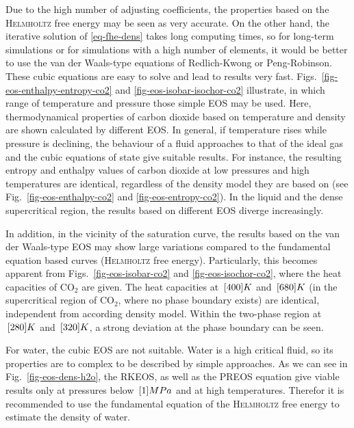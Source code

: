 Due to the high number of adjusting coefficients, the properties based on the \textsc{Helmholtz} free energy may be seen as very 
accurate. On the other hand, the iterative solution of \eqref{eq-fhe-dens} takes long computing times, so for long-term simulations or for simulations with a high number of elements, it would be better to use the {van der Waals}-type equations of {Redlich-Kwong} or {Peng-Robinson}. These cubic equations are easy to solve and lead to results very fast. Figs.~\ref{fig-eos-enthalpy-entropy-co2} and \ref{fig-eos-isobar-isochor-co2} illustrate, in which range of temperature and pressure those simple EOS may be used. Here, thermodynamical properties of carbon dioxide based on temperature and density are shown calculated by different EOS. In general, if temperature rises while pressure is declining, the behaviour of a fluid approaches to that of the ideal gas and the cubic equations of state give suitable results. For instance, the resulting entropy and enthalpy values of carbon dioxide at low pressures and high temperatures are identical, regardless of the density model they are based on (see Fig.~\ref{fig-eos-enthalpy-co2} and \ref{fig-eos-entropy-co2}). In the liquid and the dense supercritical region, the results based on different EOS diverge increasingly.

In addition, in the vicinity of the saturation curve, the results based on the {van der Waals}-type EOS may show large variations compared to the fundamental equation based curves (\textsc{Helmholtz} free energy). Particularly, this becomes apparent from Figs.~\ref{fig-eos-isobar-co2} and \ref{fig-eos-isochor-co2}, where the heat capacities of $\mathrm{CO_2}$ are given. The heat capacities at $\, \mathrm{[}400]{K}$ and $\, \mathrm{[}680]{K}$ (in the supercritical region of $\mathrm{CO_2}$, where no phase boundary exists) are identical, independent from according density model. Within the two-phase region at $\, \mathrm{[}280]{K}$ and $\, \mathrm{[}320]{K}$, a strong deviation at the phase boundary can be seen.

For water, the cubic EOS are not suitable. Water is a high critical fluid, so its properties are to complex to be described by simple approaches. As we can see in Fig.~\ref{fig-eos-dens-h2o}, the RKEOS, as well as the PREOS equation give viable results only at pressures below $\, \mathrm{[}1]{MPa}$ and at high temperatures. Therefor it is recommended to use the fundamental equation of the \textsc{Helmholtz} free energy to estimate the density of water. 

